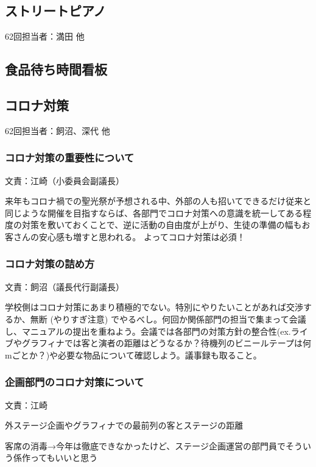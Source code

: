 \documentclass[dvipdfmx,jb5]{jarticle}
\begin{document}
 \subsection{ストリートピアノ}
62回担当者：満田 他

\subsection{食品待ち時間看板}\label{sec:食品待ち時間看板}

 \subsection{コロナ対策}
62回担当者：飼沼、深代 他

\subsubsection{コロナ対策の重要性について} 文責：江崎（小委員会副議長） \vspace{2mm}

来年もコロナ禍での聖光祭が予想される中、外部の人も招いてできるだけ従来と同じような開催を目指すならば、各部門でコロナ対策への意識を統一してある程度の対策を敷いておくことで、逆に活動の自由度が上がり、生徒の準備の幅もお客さんの安心感も増すと思われる。
よってコロナ対策は必須！

\subsubsection{コロナ対策の詰め方} 文責：飼沼（議長代行副議長） \vspace{2mm}

学校側はコロナ対策にあまり積極的でない。特別にやりたいことがあれば交渉するか、無断 (やりすぎ注意) でやるべし。何回か関係部門の担当で集まって会議し、マニュアルの提出を重ねよう。会議では各部門の対策方針の整合性(ex.ライブやグラフィナでは客と演者の距離はどうなるか？待機列のビニールテープは何mごとか？)や必要な物品について確認しよう。議事録も取ること。

\subsubsection{企画部門のコロナ対策について} 文責：江崎 \vspace{2mm}

外ステージ企画やグラフィナでの最前列の客とステージの距離

客席の消毒→今年は徹底できなかったけど、ステージ企画運営の部門員でそういう係作ってもいいと思う
\end{document}
